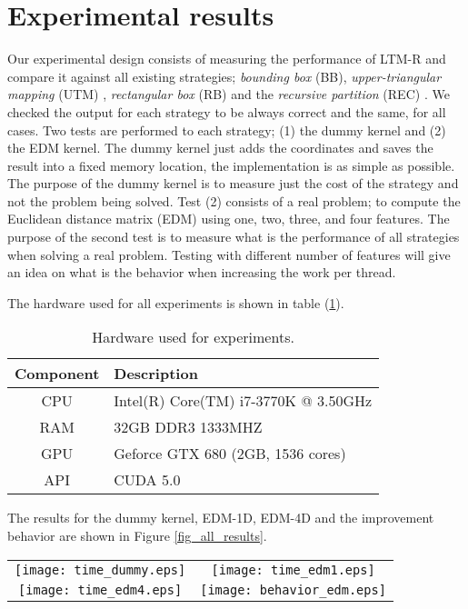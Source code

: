 \documentclass[conference]{IEEEtran}
\begin{document}
\section{Experimental results}
\label{sec_experimental_results}
Our experimental design consists of measuring the performance of LTM-R and compare it against all existing strategies; 
\textit{bounding box} (BB), \textit{upper-triangular mapping} (UTM) \cite{AvrilGA12}, \textit{rectangular box} (RB) \cite{Jung2008} and 
the \textit{recursive partition} (REC) \cite{Ries:2009:TMI:1654059.1654069}. We checked the output for each strategy to be always correct and the same, for all cases.
Two tests are performed to each strategy; (1) the dummy kernel and (2) the EDM kernel. The dummy kernel just adds the coordinates 
and saves the result into a fixed memory location, the implementation is as simple as possible. 
The purpose of the dummy kernel is to measure just the cost of the strategy and not the problem being solved. 
Test (2) consists of a real problem; to compute the Euclidean distance matrix (EDM) using one, two, three, and four features. The purpose 
of the second test is to measure what is the performance of all strategies when solving a real problem. Testing with different number of 
features will give an idea on what is the behavior when increasing the work per thread.

The hardware used for all experiments is shown in table (\ref{table_hardware}).
\begin{table}[ht!]
\caption{Hardware used for experiments.}
\begin{center}
\begin{tabular}{|c|l|}
\hline
Component	&	Description\\ \hline
CPU		&	Intel(R) Core(TM) i7-3770K @ 3.50GHz \\
RAM		&	32GB DDR3 1333MHZ\\
GPU		&	Geforce GTX 680 (2GB, 1536 cores) \\
API		&	CUDA 5.0 \\ \hline
\end{tabular}
\end{center}
\label{table_hardware}
\end{table}

The results for the dummy kernel, EDM-1D, EDM-4D and the improvement behavior are shown in Figure \ref{fig_all_results}.
\begin{figure*}[ht!]
\centering
\begin{tabular}{cc}
\texttt{[image: time\_dummy.eps]} & \texttt{[image: time\_edm1.eps]}\\
\texttt{[image: time\_edm4.eps]} & \texttt{[image: behavior\_edm.eps]}
\end{tabular}
\caption{Results for the dummy kernel, EDM and the behavior of $I$ when scaling the number of features.}
\label{fig_all_results}
\end{figure*}
\end{document}
